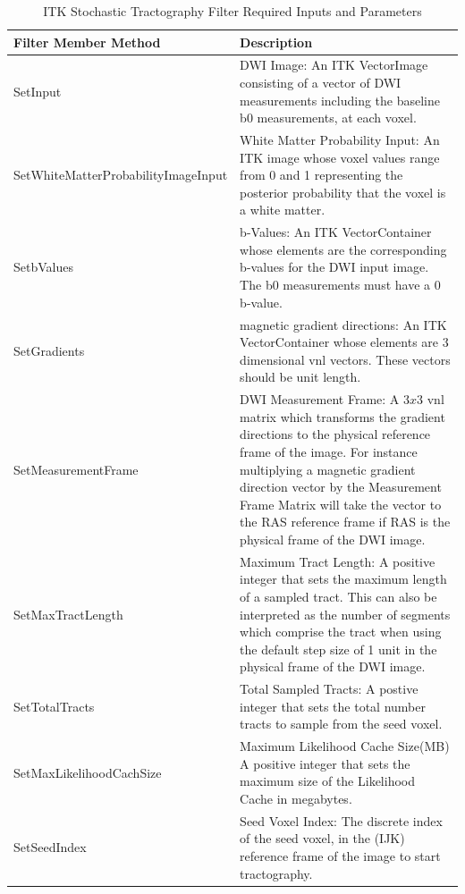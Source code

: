\begin{table} \label{tab:filterinputs}
  \center
  \begin{tabular}{| l | p{8cm} |}
    \hline 
    Filter Member Method & Description\\
    \hline
    \small{SetInput} & DWI Image: An ITK VectorImage consisting of a vector of DWI measurements including the baseline b0 measurements, at each voxel. \\
    \hline
    \small{SetWhiteMatterProbabilityImageInput} & White Matter Probability Input: An ITK image whose voxel values range from 0 and 1 representing the posterior probability that the voxel is a white matter.  \\
    \hline
    \small{SetbValues} &  b-Values: An ITK VectorContainer whose elements are the corresponding b-values for the DWI input image.  The b0 measurements must have a 0 b-value. \\
    \hline
    \small{SetGradients} & magnetic gradient directions: An ITK VectorContainer whose elements are 3 dimensional vnl vectors.  These vectors should be unit length.\\
    \hline
    \small{SetMeasurementFrame} & DWI Measurement Frame: A $3x3$ vnl matrix which transforms the gradient directions to the physical reference frame of the image.  For instance multiplying a magnetic gradient direction vector by the Measurement Frame Matrix will take the vector to the RAS reference frame if RAS is the physical frame of the DWI image. \\
    \hline
    \small{SetMaxTractLength} & Maximum Tract Length: A positive integer that sets the maximum length of a sampled tract.  This can also be interpreted as the number of segments which comprise the tract when using the default step size of 1 unit in the physical frame of the DWI image. \\
    \hline
    \small{SetTotalTracts} & Total Sampled Tracts: A postive integer that sets the total number tracts to sample from the seed voxel. \\
    \hline
    \small{SetMaxLikelihoodCachSize} & Maximum Likelihood Cache Size(MB) A positive integer that sets the maximum size of the Likelihood Cache in megabytes.\\
    \hline
    \small{SetSeedIndex} & Seed Voxel Index:  The discrete index of the seed voxel, in the (IJK) reference frame of the image to start tractography.\\
    \hline
  \end{tabular}
  \caption{ITK Stochastic Tractography Filter Required Inputs and Parameters}
\end{table}

